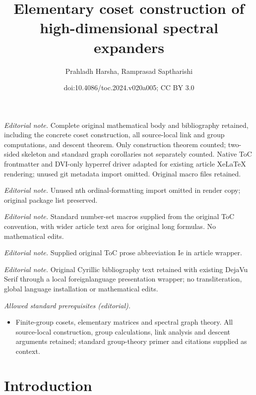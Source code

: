 \documentclass[11pt]{article}
\title{Elementary coset construction of high-dimensional spectral expanders}
\author{Prahladh Harsha, Ramprasad Saptharishi}
\date{doi:10.4086/toc.2024.v020a005; CC BY 3.0}
\begin{document}
\maketitle
\noindent\textit{Editorial note.} Complete original mathematical body and bibliography retained, including the concrete coset construction, all source-local link and group computations, and descent theorem. Only construction theorem counted; two-sided skeleton and standard graph corollaries not separately counted. Native ToC frontmatter and DVI-only hyperref driver adapted for existing article XeLaTeX rendering; unused git metadata import omitted. Original macro files retained.\par\medskip
\noindent\textit{Editorial note.} Unused nth ordinal-formatting import omitted in render copy; original package list preserved.\par\medskip
\noindent\textit{Editorial note.} Standard number-set macros supplied from the original ToC convention, with wider article text area for original long formulas. No mathematical edits.\par\medskip
\noindent\textit{Editorial note.} Supplied original ToC prose abbreviation Ie in article wrapper.\par\medskip
\noindent\textit{Editorial note.} Original Cyrillic bibliography text retained with existing DejaVu Serif through a local foreignlanguage presentation wrapper; no transliteration, global language installation or mathematical edits.\par\medskip
\noindent\textit{Allowed standard prerequisites (editorial).}\begin{itemize}
\item Finite-group cosets, elementary matrices and spectral graph theory. All source-local construction, group calculations, link analysis and descent arguments retained; standard group-theory primer and citations supplied as context.
\end{itemize}\medskip
\section{Introduction}
\end{document}
